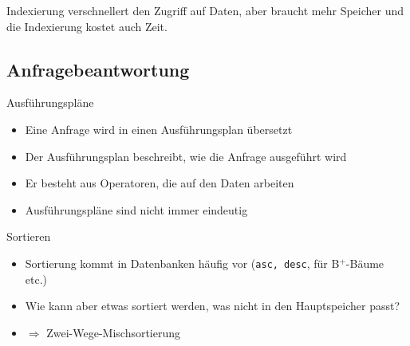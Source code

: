 \documentclass{article}
\begin{document}
Indexierung verschnellert den Zugriff auf Daten, aber braucht mehr Speicher und die Indexierung kostet auch Zeit.

\subsection*{Anfragebeantwortung}

\begin{block}{Ausführungspläne}
  \begin{itemize}
    \item Eine Anfrage wird in einen Ausführungsplan übersetzt
    \item Der Ausführungsplan beschreibt, wie die Anfrage ausgeführt wird
    \item Er besteht aus Operatoren, die auf den Daten arbeiten
    \item Ausführungspläne sind nicht immer eindeutig
  \end{itemize}
\end{block}

\begin{block}{Sortieren}
  \begin{itemize}
    \item Sortierung kommt in Datenbanken häufig vor (\texttt{asc, desc}, für B$^+$-Bäume etc.)
    \item Wie kann aber etwas sortiert werden, was nicht in den Hauptspeicher passt?
    \item $\Rightarrow$ Zwei-Wege-Mischsortierung
  \end{itemize}
\end{block}
\end{document}
